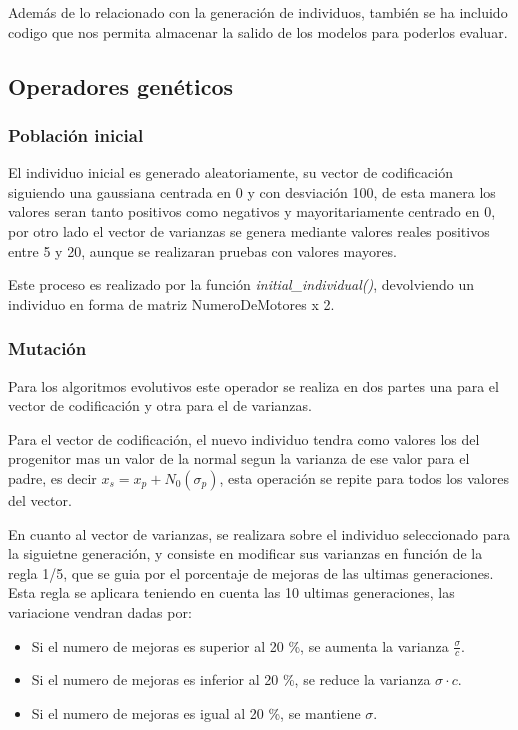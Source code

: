 \documentclass[12pt, spanish, pdftex]{UC3M_document}
\begin{document}
Además de lo relacionado con la generación de individuos, también se ha incluido codigo que nos permita almacenar la salido de los modelos para poderlos evaluar.

\subsection{Operadores genéticos}
\subsubsection{Población inicial}
El individuo inicial es generado aleatoriamente, su vector de codificación siguiendo una gaussiana centrada en 0 y con desviación 100, de esta manera los valores seran tanto positivos como negativos y mayoritariamente centrado en 0, por otro lado el vector de varianzas se genera mediante valores reales positivos entre 5 y 20, aunque se realizaran pruebas con valores mayores.

Este proceso es realizado por la función \textit{initial\_individual()}, devolviendo un individuo en forma de matriz NumeroDeMotores x 2.  

\subsubsection{Mutación}
Para los algoritmos evolutivos este operador se realiza en dos partes una para el vector de codificación y otra para el de varianzas.

Para el vector de codificación, el nuevo individuo tendra como valores los del progenitor mas un valor de la normal segun la varianza de ese valor para el padre, es decir $x_s=x_p+N_0(\sigma_p)$, esta operación se repite para todos los valores del vector.

En cuanto al vector de varianzas, se realizara sobre el individuo seleccionado para la siguietne generación, y consiste en modificar sus varianzas en función de la regla 1/5, que se guia por el porcentaje de mejoras de las ultimas generaciones. Esta regla se aplicara teniendo en cuenta las 10 ultimas generaciones, las variacione vendran dadas por:
\begin{itemize}
	\item Si el numero de mejoras es superior al 20 \%, se aumenta la varianza $\frac \sigma c$.
	\item Si el numero de mejoras es inferior al 20 \%, se reduce la varianza $\sigma \cdot c$.
	\item Si el numero de mejoras es igual al 20 \%, se mantiene $\sigma$.
\end{itemize}
\end{document}
